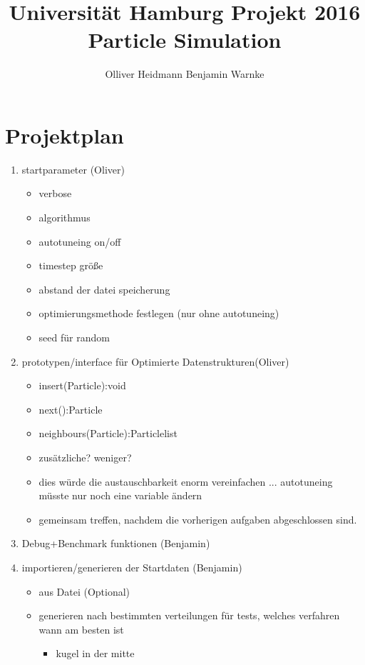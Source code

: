 \documentclass[a4paper]{article}
\title{Universität Hamburg Projekt 2016 Particle Simulation}
\author{Olliver Heidmann Benjamin Warnke}
\begin{document}
\maketitle

\section{Projektplan}
\begin{enumerate}
\item startparameter (Oliver)
    \begin{itemize}
        	\item verbose
            \item algorithmus
            \item autotuneing on/off
            \item timestep größe
            \item abstand der datei speicherung
            \item optimierungsmethode festlegen (nur ohne autotuneing)
            \item seed für random
        \end{itemize}
\item prototypen/interface für Optimierte Datenstrukturen(Oliver)
	\begin{itemize}
        \item  insert(Particle):void
        \item  next():Particle
        \item  neighbours(Particle):Particlelist
        \item  zusätzliche? weniger?
        \item  dies würde die austauschbarkeit enorm vereinfachen ... autotuneing müsste nur noch eine variable ändern
        \item  gemeinsam treffen, nachdem die vorherigen aufgaben abgeschlossen sind.
    \end{itemize}
\item Debug+Benchmark funktionen (Benjamin)
\item importieren/generieren der Startdaten (Benjamin)
	\begin{itemize}
        \item aus Datei (Optional)
        \item  generieren nach bestimmten verteilungen für tests, welches verfahren wann am besten ist
        \begin{itemize}
        	\item  kugel in der mitte

\end{itemize}
\end{itemize}
\end{enumerate}
\end{document}
